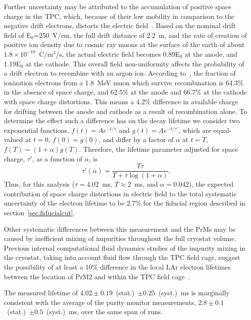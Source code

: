 \documentclass[10pt,a4paper]{article}
\begin{document}
Further uncertainty may be attributed to the accumulation of positive space charge in the TPC, which, because of their low mobility in comparison to the negative drift electrons, distorts the electric field~\cite{palestini}. Based on the nominal drift field of E$_0$=250~V/cm, the full drift distance of 2.2~m, and the rate of creation of positive ion density due to cosmic ray muons at the surface of the earth of about $1.8\times 10^{-10}$~C/m$^3$/s, the actual electric field becomes 0.89E$_0$ at the anode, and 1.19E$_0$ at the cathode. This overall field non-uniformity affects the probability of a drift electron to recombine with an argon ion. According to~\cite{argoneut-recombination}, the fraction of ionization electrons from a 1.8~MeV muon which survive recombination is 64.3\% in the absence of space charge, and 62.5\% at the anode and 66.7\% at the cathode with space charge distortions. This means a 4.2\% difference in available charge for drifting between the anode and cathode as a result of recombination alone. To determine the effect such a difference has on the decay lifetime we consider two exponential functions, $f(t)=Ae^{-t/\tau}$ and $g(t)=Ae^{-t/\tau'}$, which are equal-valued at $t=0$, $f(0)=g(0)$, and differ by a factor of $\alpha$ at $t=T$, $f(T)=(1+\alpha)g(T)$. Therefore, the lifetime parameter adjusted for space charge, $\tau'$, as a function of $\alpha$, is
\begin{equation}\label{eq:tauprime}
\tau'(\alpha) = \frac{T\tau}{T+\tau\log{(1+\alpha)}}.
\end{equation}
Thus, for this analysis ($\tau=4.02$~ms, $T\approx 2$~ms, and $\alpha=0.042$), the expected contribution of space charge distortions in electric field to the total systematic uncertainty of the electron lifetime to be 2.7\% for the fiducial region described in section~\ref{sec:fiducialcut}.

Other systematic differences between this measurement and the PrMs may be caused by inefficient mixing of impurities throughout the full cryostat volume. Previous internal computational fluid dynamics studies of the impurity mixing in the cryostat, taking into account fluid flow through the TPC field cage, suggest the possibility of at least a 10\% difference in the local LAr electron lifetimes between the location of PrM2 and within the TPC field cage~\cite{sdsu-cfd}. 

The measured lifetime of $4.02\pm0.19$~(stat.)~$\pm 0.25$~(syst.)~ms is marginally consistent with the average of the purity monitor measurements, $2.8\pm0.1$~(stat.)~$\pm0.5$~(syst.)~ms, over the same span of runs. 
\end{document}
